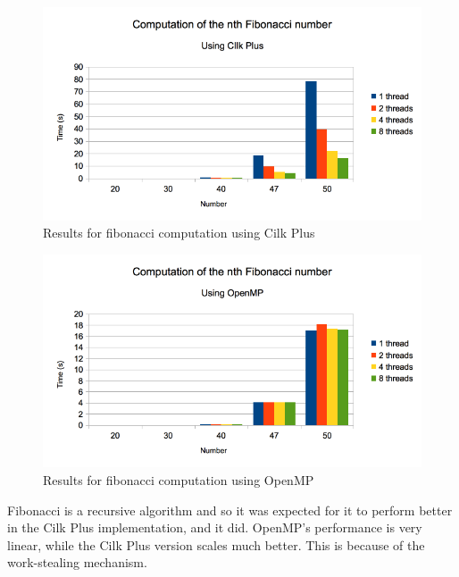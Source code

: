 \documentclass[a4paper,10pt,openright,openbib,twocolumn]{article}
\begin{document}
        \begin{figure}[H]
            \centering
            \includegraphics[scale=0.45]{images/fibcilk.png}
            \caption{Results for fibonacci computation using Cilk Plus}
            \label{roofline}
        \end{figure}
        \begin{figure}[H]
            \centering
            \includegraphics[scale=0.45]{images/fibopenmp.png}
            \caption{Results for fibonacci computation using OpenMP}
            \label{roofline}
        \end{figure}
        Fibonacci is a recursive algorithm and so it was expected for it to perform better in the Cilk Plus implementation, and it did. OpenMP's performance is very linear, while the Cilk Plus version scales much better. This is because of the work-stealing mechanism. \\
\end{document}
